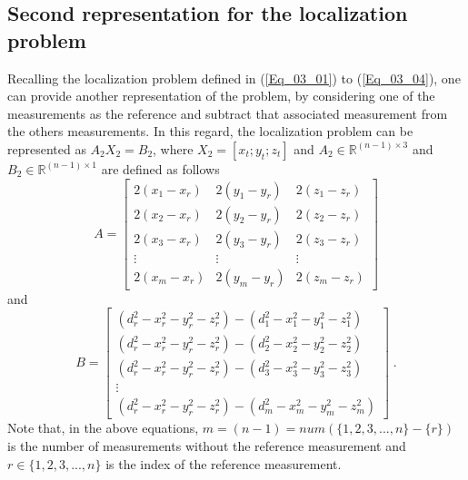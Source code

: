 \documentclass{article}
\begin{document}
\subsection{Second representation for the localization problem}
Recalling the localization problem defined in (\ref{Eq_03_01}) to (\ref{Eq_03_04}), one can provide another representation of the problem, by considering one of the measurements as the reference and subtract that associated measurement from the others measurements. In this regard, the localization problem can be represented as $A_2 X_2 = B_2$, where $X_2 = [x_t;y_t;z_t]$ and $A_2 \in \mathbb{R}^{(n-1)\times3}$ and $B_2 \in \mathbb{R}^{(n-1)\times1}$ are defined as follows
\begin{equation}\label{Eq_03_12}
A = \left[\begin{matrix}
 2(x_1-x_r) & 2(y_1-y_r) & 2(z_1-z_r) \\
 2(x_2-x_r) & 2(y_2-y_r) & 2(z_2-z_r) \\
 2(x_3-x_r) & 2(y_3-y_r) & 2(z_3-z_r) \\
\vdots & \vdots & \vdots  \\
 2(x_m-x_r) & 2(y_m-y_r) & 2(z_m-z_r)
\end{matrix}\right]
\end{equation}
and
\begin{equation} \label{Eq_03_13}
B = \left[\begin{matrix}
( d_r^2 - x_r^2 - y_r^2 - z_r^2 ) - ( d_1^2 - x_1^2 - y_1^2 - z_1^2 ) \\
( d_r^2 - x_r^2 - y_r^2 - z_r^2 ) - ( d_2^2 - x_2^2 - y_2^2 - z_2^2 ) \\
( d_r^2 - x_r^2 - y_r^2 - z_r^2 ) - ( d_3^2 - x_3^2 - y_3^2 - z_3^2 ) \\
\vdots \\
( d_r^2 - x_r^2 - y_r^2 - z_r^2 ) - ( d_m^2 - x_m^2 - y_m^2 - z_m^2 )
\end{matrix}\right] \;.
\end{equation}
Note that, in the above equations, $m=(n-1)=\textit{num}(\{1,2,3,...,n\}-\{r\})$ is the number of measurements without the reference measurement and $r \in \{1,2,3,...,n\}$ is the index of the reference measurement. 
\end{document}
